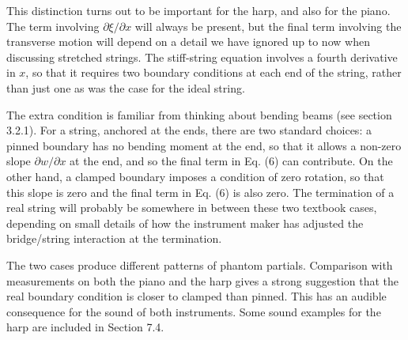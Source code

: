   This distinction turns out to be important for the harp, and also for the 
  piano. The term involving $\partial \xi/\partial x$ will always be present, 
  but the final term involving the transverse motion will depend on a detail we 
  have ignored up to now when discussing stretched strings. The stiff-string 
  equation involves a fourth derivative in $x$, so that it requires two 
  boundary conditions at each end of the string, rather than just one as was 
  the case for the ideal string. 

  The extra condition is familiar from thinking about bending beams (see 
  section 3.2.1). For a string, anchored at the ends, there are two standard 
  choices: a pinned boundary has no bending moment at the end, so that it 
  allows a non-zero slope $\partial w/\partial x$ at the end, and so the final 
  term in Eq. (6) can contribute. On the other hand, a clamped boundary imposes 
  a condition of zero rotation, so that this slope is zero and the final term 
  in Eq. (6) is also zero. The termination of a real string will probably be 
  somewhere in between these two textbook cases, depending on small details of 
  how the instrument maker has adjusted the bridge/string interaction at the 
  termination. 

  The two cases produce different patterns of phantom partials. Comparison with 
  measurements on both the piano and the harp gives a strong suggestion that 
  the real boundary condition is closer to clamped than pinned. This has an 
  audible consequence for the sound of both instruments. Some sound examples 
  for the harp are included in Section 7.4. 